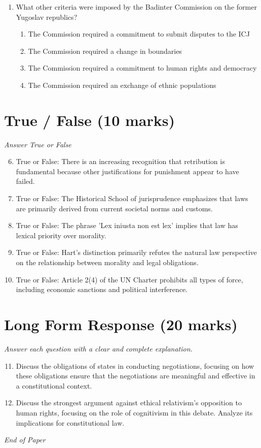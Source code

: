 \documentclass[12pt]{article}
\begin{document}
\begin{enumerate}[label=\arabic*.]
\begin{enumerate}[label=(\alph*)]
    \item Airey v Ireland (1979)
    \item Osman v UK ( 1998)
    \item Handyside v UK (1976)
\end{enumerate}
\item What other criteria were imposed by the Badinter Commission on the former Yugoslav republics?
\begin{enumerate}[label=(\alph*)]
    \item The Commission required a commitment to submit disputes to the ICJ
    \item The Commission required a change in boundaries
    \item The Commission required a commitment to human rights and democracy
    \item The Commission required an exchange of ethnic populations
\end{enumerate}
\end{enumerate}

\section*{True / False (10 marks)}
\textit{Answer True or False}
\begin{enumerate}[label=\arabic*.]
\setcounter{enumi}{5}
\item True or False: There is an increasing recognition that retribution is fundamental because other justifications for punishment appear to have failed.
\item True or False: The Historical School of jurisprudence emphasizes that laws are primarily derived from current societal norms and customs.
\item True or False: The phrase 'Lex iniusta non est lex' implies that law has lexical priority over morality.
\item True or False: Hart's distinction primarily refutes the natural law perspective on the relationship between morality and legal obligations.
\item True or False: Article 2(4) of the UN Charter prohibits all types of force, including economic sanctions and political interference.
\end{enumerate}

\section*{Long Form Response (20 marks)}
\textit{Answer each question with a clear and complete explanation.}
\begin{enumerate}[label=\arabic*.]
\setcounter{enumi}{10}
\item Discuss the obligations of states in conducting negotiations, focusing on how these obligations ensure that the negotiations are meaningful and effective in a constitutional context.
\item Discuss the strongest argument against ethical relativism's opposition to human rights, focusing on the role of cognitivism in this debate. Analyze its implications for constitutional law.
\end{enumerate}

\vfill
\noindent\textit{End of Paper}
\end{document}
